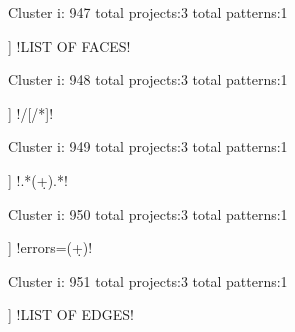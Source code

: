 Cluster i: 947
total projects:3
total patterns:1
\begin{multicols}{1}
\begin{description}[noitemsep,topsep=0pt]
\item [[3] ] \cverb!LIST OF FACES!
\end{description}
\end{multicols}







Cluster i: 948
total projects:3
total patterns:1
\begin{multicols}{1}
\begin{description}[noitemsep,topsep=0pt]
\item [[3] ] \cverb!\s*/[/*]\s*!
\end{description}
\end{multicols}







Cluster i: 949
total projects:3
total patterns:1
\begin{multicols}{1}
\begin{description}[noitemsep,topsep=0pt]
\item [[3] ] \cverb!.*\s(\d+).*!
\end{description}
\end{multicols}







Cluster i: 950
total projects:3
total patterns:1
\begin{multicols}{1}
\begin{description}[noitemsep,topsep=0pt]
\item [[3] ] \cverb!errors=(\d+)!
\end{description}
\end{multicols}







Cluster i: 951
total projects:3
total patterns:1
\begin{multicols}{1}
\begin{description}[noitemsep,topsep=0pt]
\item [[3] ] \cverb!LIST OF EDGES!
\end{description}
\end{multicols}







